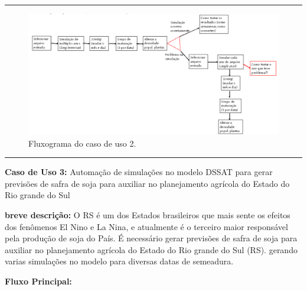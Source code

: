 \documentclass[tg]{mdtufsm}
\begin{document}
	\bigskip \hrule \bigskip

	\begin{figure}[!htb]
		{\centering
		\includegraphics[width=1.0\textwidth]{imagens/SoysimFlux}
		\caption{Fluxograma do caso de uso 2.}
		\label{fig:SoysimFlux}}
	\end{figure}

	\bigskip \hrule \bigskip


	{\bf Caso de Uso 3:} Automação de simulações no modelo DSSAT para gerar previsões de safra de soja para auxiliar no planejamento agrícola do Estado do Rio grande do Sul
	\bigskip

	{\bf breve descrição:} O RS é um dos Estados brasileiros que mais sente os efeitos dos fenômenos El Nino e La Nina, e atualmente é o terceiro maior responsável pela produção de soja do País. É necessário gerar previsões de safra de soja para auxiliar no planejamento agrícola do Estado do Rio grande do Sul (RS). gerando varias simulações no modelo para diversas datas de semeadura.
	\bigskip

	{\bf Fluxo Principal:}
\end{document}
